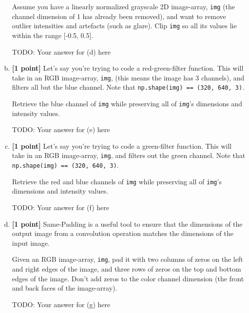 \begin{enumerate}[(a)]
    Assume you have a linearly normalized grayscale 2D image-array, \texttt{img} (the channel dimension of 1 has already been removed), and want to remove outlier intensities and artefacts (such as glare). Clip \texttt{img} so all its values lie within the range [-0.5, 0.5].

    \begin{mdframed}
        TODO: Your answer for (d) here
    \end{mdframed}
    
    \item \textbf{[1 point]} Let's say you're trying to code a red-green-filter function. This will take in an RGB image-array, \texttt{img}, (this means the image has 3 channels), and filters all but the blue channel. Note that \texttt{np.shape(img) == (320, 640, 3)}.
    
    Retrieve the blue channel of \texttt{img} while preserving all of \texttt{img}'s dimensions and intensity values.
    
    \begin{mdframed}
        TODO: Your answer for (e) here
    \end{mdframed}
    
    \item \textbf{[1 point]} Let's say you're trying to code a green-filter function. This will take in an RGB image-array, \texttt{img}, and filters out the green channel. Note that \texttt{np.shape(img) == (320, 640, 3)}. 
    
    Retrieve the red and blue channels of \texttt{img} while preserving all of \texttt{img}'s dimensions and intensity values.
    
    \begin{mdframed}
        TODO: Your answer for (f) here
    \end{mdframed}
    
    \item \textbf{[1 point]} Same-Padding is a useful tool to ensure that the dimensions of the output image from a convolution operation matches the dimensions of the input image. 
    
    Given an RGB image-array, \texttt{img}, pad it with two columns of zeros on the left and right edges of the image, and three rows of zeros on the top and bottom edges of the image. Don't add zeros to the color channel dimension (the front and back faces of the image-array).
    
    \begin{mdframed}
        TODO: Your answer for (g) here
    \end{mdframed}
    
\end{enumerate}


